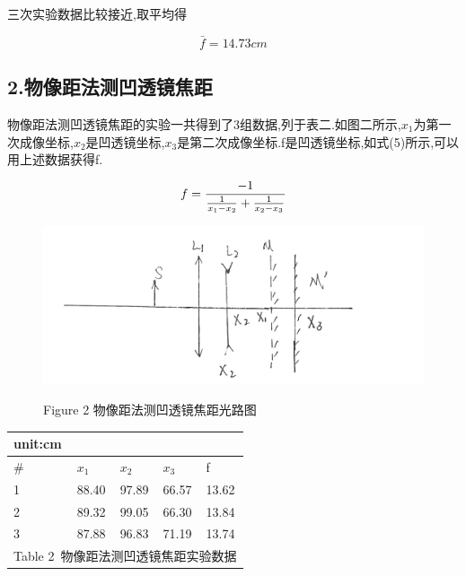\documentclass[a4paper,10pt,notitlepage]{report}
\begin{document}
	三次实验数据比较接近,取平均得

\begin{equation}
	\bar{f} = 14.73 cm
\end{equation}

\subsection*{2.物像距法测凹透镜焦距}

	物像距法测凹透镜焦距的实验一共得到了3组数据,列于表二.如图二所示,$x_1$为第一次成像坐标,$x_2$是凹透镜坐标,$x_3$是第二次成像坐标.f是凹透镜坐标,如式(5)所示,可以用上述数据获得f.
	
\begin{equation}
	f=\frac{-1}{\frac{1}{x_1 - x_2} + \frac{1}{x_2 - x_3}} \\
\end{equation}

\begin{figure}[htbp]
\centering

	\includegraphics[bb=0 0 1309 545,scale=.15]{wxa.jpg}
	\begin{center}
		\scriptsize Figure 2 物像距法测凹透镜焦距光路图
	\end{center}

\end{figure}

\begin{table}[htbp]
\centering
	\begin{tabular}{|l|l|l|l|l|}

		\multicolumn{1}{l}{\scriptsize unit:cm} \\
		\hline
		\# & $x_1$ & $ x_2$ & $x_3$ & f \\
		\hline
		1 & 88.40 & 97.89 & 66.57 & 13.62 \\
		\hline
		2 & 89.32 & 99.05 & 66.30 & 13.84 \\
		\hline
		3 & 87.88 & 96.83 & 71.19 & 13.74 \\
		\hline
		\multicolumn{5}{c}{\scriptsize Table 2\ 物像距法测凹透镜焦距实验数据} \\
	
	\end{tabular}
\end{table}
\end{document}
